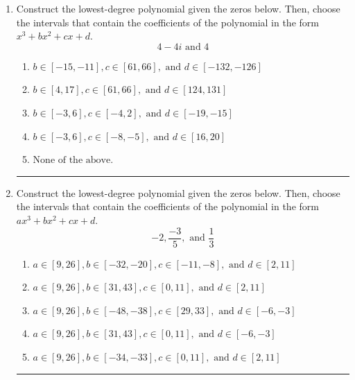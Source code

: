 \documentclass[14pt]{extbook}
\newcommand{\litem}[1]{\item#1\hspace*{-1cm}\rule{\textwidth}{0.4pt}}
\begin{document}
\begin{enumerate}
{\begin{enumerate}[label=\Alph*.]
\end{enumerate} }
\litem{
Construct the lowest-degree polynomial given the zeros below. Then, choose the intervals that contain the coefficients of the polynomial in the form $x^3+bx^2+cx+d$.\[ 4 - 4 i \text{ and } 4 \]\begin{enumerate}[label=\Alph*.]
\item \( b \in [-15, -11], c \in [61, 66], \text{ and } d \in [-132, -126] \)
\item \( b \in [4, 17], c \in [61, 66], \text{ and } d \in [124, 131] \)
\item \( b \in [-3, 6], c \in [-4, 2], \text{ and } d \in [-19, -15] \)
\item \( b \in [-3, 6], c \in [-8, -5], \text{ and } d \in [16, 20] \)
\item \( \text{None of the above.} \)

\end{enumerate} }
\litem{
Construct the lowest-degree polynomial given the zeros below. Then, choose the intervals that contain the coefficients of the polynomial in the form $ax^3+bx^2+cx+d$.\[ -2, \frac{-3}{5}, \text{ and } \frac{1}{3} \]\begin{enumerate}[label=\Alph*.]
\item \( a \in [9, 26], b \in [-32, -20], c \in [-11, -8], \text{ and } d \in [2, 11] \)
\item \( a \in [9, 26], b \in [31, 43], c \in [0, 11], \text{ and } d \in [2, 11] \)
\item \( a \in [9, 26], b \in [-48, -38], c \in [29, 33], \text{ and } d \in [-6, -3] \)
\item \( a \in [9, 26], b \in [31, 43], c \in [0, 11], \text{ and } d \in [-6, -3] \)
\item \( a \in [9, 26], b \in [-34, -33], c \in [0, 11], \text{ and } d \in [2, 11] \)


\end{enumerate}}
\end{enumerate}
\end{document}
